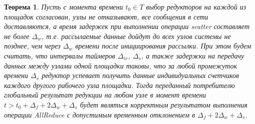 \documentclass{article}
\theoremstyle{plain}
\newtheorem{theorem}{Теорема}[section]
\theoremstyle{plain}
\theoremstyle{plain}
\theoremstyle{plain}
\theoremstyle{definition}
\theoremstyle{remark}
\theoremstyle{plain}
\begin{document}
\begin{theorem}
\label{ConsistentStateCorrectness}
    Пусть с момента времени $t_0 \in T$ выбор редукторов на каждой из площадок согласован, узлы не отказывают, все сообщения в сети доставляются, а время задержек при выполнении операции scatter составляет не более $\Delta_w$, т.е. рассылаемые данные дойдут до всех узлов системы не позднее, чем через $\Delta_w$ времени после инициирования рассылки. При этом будем считать, что интервалы таймеров $\Delta_{iv}$, $\Delta_s$, а также задержки на передачу данных между узлами одной площадки таковы, что за любой промежуток времени $\Delta_s$ редуктор успевает получить данные индивидуальных счетчиков каждого другого рабочего узла площадки. Тогда переданный потребителю глобальный результат редукции на любом узле в момент времени $t > t_0 + \Delta_f + 2\Delta_w + \Delta_s$ будет являться корректным результатом выполнения операции AllReduce с допустимым временным отклонением в $\Delta_f + 2\Delta_w + \Delta_s$.
\end{theorem}
\end{document}
